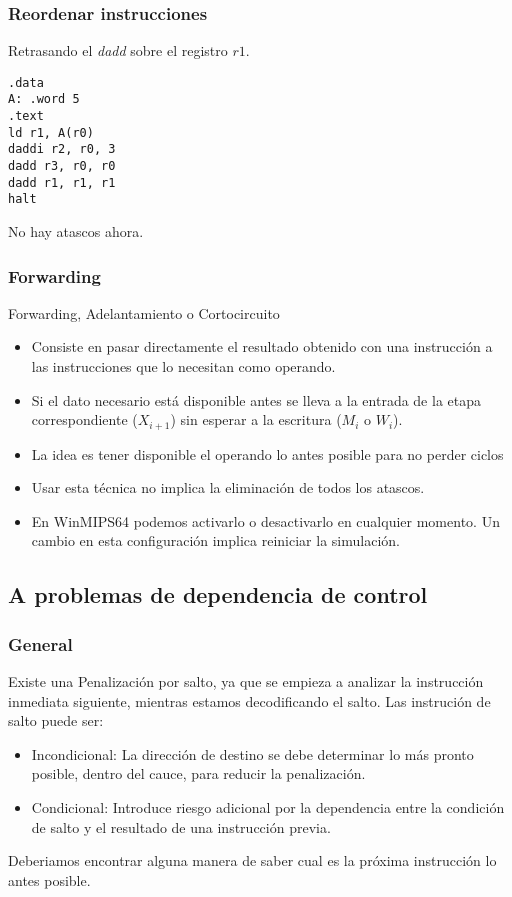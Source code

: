 \documentclass{beamer}
\begin{document}
\begin{frame}[fragile]
\frametitle{Reordenar instrucciones}
Retrasando el \emph{dadd} sobre el registro $r1$.
\begin{block}{}
\begin{lstlisting}[language=WinMIPS64,basicstyle=\ttfamily,keywordstyle=\color{blue}]
.data
A: .word 5
.text
ld r1, A(r0)
daddi r2, r0, 3
dadd r3, r0, r0
dadd r1, r1, r1
halt
\end{lstlisting}
\end{block}
No hay atascos ahora.
\end{frame}



\begin{frame}[fragile]
\frametitle{Forwarding}
Forwarding, Adelantamiento o Cortocircuito
\begin{itemize}
\item Consiste en pasar directamente el resultado obtenido con una instrucción a las instrucciones que lo necesitan como operando.
\item Si el dato necesario está disponible antes se lleva a la entrada de la etapa correspondiente ($X_{i+1}$) sin esperar a la escritura ($M_{i}$ o $W_{i}$).
\item La idea es tener disponible el operando lo antes posible para no perder ciclos
\item Usar esta técnica no implica la eliminación de todos los atascos.
\item En WinMIPS64 podemos activarlo o desactivarlo en cualquier momento. Un cambio en esta configuración implica reiniciar la simulación.
\end{itemize}
\end{frame}

\subsection{A problemas de dependencia de control}
\begin{frame}
\frametitle{General}
Existe una Penalización por salto, ya que se empieza a analizar la instrucción inmediata siguiente, mientras estamos decodificando el salto. Las instrución de salto puede ser: 
\begin{itemize}
\item Incondicional: La dirección de destino se debe determinar lo más pronto posible, dentro del cauce, para reducir la penalización.
\item Condicional: Introduce riesgo adicional por la dependencia entre la condición de salto y el resultado de una instrucción previa.
\end{itemize}
Deberiamos encontrar alguna manera de saber cual es la próxima instrucción lo antes posible.
\end{frame}
\end{document}
